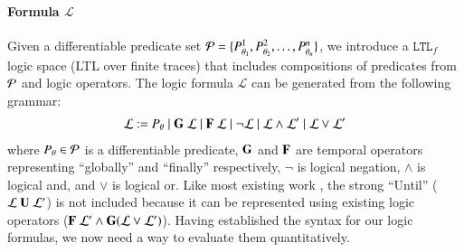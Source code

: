 \paragraph{Formula $\mathcal{L}$}
Given a differentiable predicate set $\mathcal{P} = \{P^{1}_{\theta_1}, P^{2}_{\theta_2}, \ldots, P^{n}_{\theta_n}\}$, we introduce a $\mathtt{LTL}_f$ logic space \cite{LTLf} (LTL over finite traces) that includes compositions of predicates from $\mathcal{P}$ and logic operators. The logic formula  $\mathcal{L}$ can be generated from the following grammar:
\begin{align}
    \mathcal{L} := P_{\theta} \mid \mathbf{G}\ \mathcal{L} \mid \mathbf{F}\ \mathcal{L} \mid \lnot \mathcal{L} \mid \mathcal{L} \land \mathcal{L}' \mid \mathcal{L} \lor \mathcal{L}'
    \label{eq:logic_formula_syntax}
\end{align}
where $P_{\theta} \in \mathcal{P}$ is a differentiable predicate, $\mathbf{G}$ and $\mathbf{F}$ are temporal operators representing ``globally'' and ``finally'' respectively, $\lnot$ is logical negation, $\land$ is logical and, and $\lor$ is logical or.  Like most existing work \cite{bartocci2022survey}, the strong ``Until'' ($\mathcal{L}\ \mathbf{U}\ \mathcal{L}'$) is not included because it can be represented using existing logic operators ($\mathbf{F}\ \mathcal{L}' \wedge \mathbf{G}(\mathcal{L} \lor \mathcal{L}')$). Having established the syntax for our logic formulas, we now need a way to evaluate them quantitatively.

